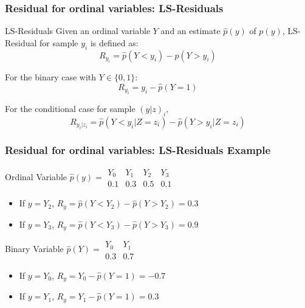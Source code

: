 \documentclass{beamer}
\begin{document}
\begin{frame}
	\frametitle{Residual for ordinal variables: LS-Residuals}
	\begin{block}{LS-Residuals}
	Given an ordinal variable $ Y $ and an estimate $ \hat{p}(y) $ of $
	p(y) $, LS-Residual for sample $ y_i $ is defined as:
	$$ R_{y_i} = \hat{p}(Y < y_i) - \hat{p}(Y > y_i) $$
	\end{block}

	For the binary case with $ Y \in \{0, 1\} $:
	$$ R_{y_i} = y_i - \hat{p}(Y = 1) $$
	\vspace{1em}

	For the conditional case for sample $ (y|z)_i $,
	$$ R_{y_i | z_i} = \hat{p}(Y < y_i | Z=z_i) - \hat{p}(Y>y_i|Z=z_i) $$

\end{frame}

\begin{frame}
	\frametitle{Residual for ordinal variables: LS-Residuals Example}
	\begin{block}{Ordinal Variable}
		\vspace{1em}
			$ \hat{p}(y) = \begin{array}{llll} Y_0 & Y_1 & Y_2 & Y_3 \\ 0.1 & 0.3 & 0.5 & 0.1 \end{array} $
		\begin{itemize}
			\item If $ y = Y_2 $, $ R_{y} = \hat{p}(Y < Y_2) - \hat{p}(Y > Y_2) = 0.3 $
			\item If $ y = Y_3 $, $ R_{y} = \hat{p}(Y < Y_3) - \hat{p}(Y > Y_3) = 0.9 $
		\end{itemize}
	\end{block}
	\begin{block}{Binary Variable}
		$\hat{p}(Y) = \begin{array}{ll} Y_0 & Y_1 \\ 0.3 & 0.7 \end{array} $
		\begin{itemize}	
			\item If $ y = Y_0 $, $ R_{y} = Y_0 - \hat{p}(Y=1) = -0.7 $
			\item If $ y = Y_1 $, $ R_{y} = Y_1 - \hat{p}(Y=1) = 0.3 $
		\end{itemize}
	\end{block}
\end{frame}
\end{document}
